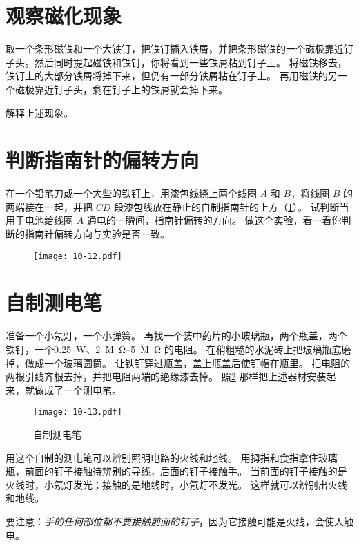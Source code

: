\section{观察磁化现象}
取一个条形磁铁和一个大铁钉，把铁钉插入铁屑，并把条形磁铁的一个磁极靠近钉子头。然后同时提起磁铁和铁钉，你将看到一些铁屑粘到钉子上。
将磁铁移去，铁钉上的大部分铁屑将掉下来，但仍有一部分铁屑粘在钉子上。
再用磁铁的另一个磁极靠近钉子头，剩在钉子上的铁屑就会掉下来。

解释上述现象。

\section{判断指南针的偏转方向}
在一个铅笔刀或一个大些的铁钉上，用漆包线绕上两个线圈 $A$ 和 $B$，将线圈 $B$ 的两端接在一起，并把 $CD$ 段漆包线放在静止的自制指南针的上方（\cref{fig:10-12}）。
试判断当用于电池给线圈 $A$ 通电的一瞬间，指南针偏转的方向。
做这个实验，看一看你判断的指南针偏转方向与实验是否一致。
\begin{figure}
  \texttt{[image: 10-12.pdf]}
  \caption{}\label{fig:10-12}
\end{figure}

\section{自制测电笔}
准备一个小氖灯，一个小弹簧。
再找一个装中药片的小玻璃瓶，两个瓶盖，两个铁钉，一个\qty{0.25}{W}、\qtyrange{2}{5}{M\ohm} 的电阻。
在稍粗糙的水泥砖上把玻璃瓶底磨掉，做成一个玻璃圆筒。
让铁钉穿过瓶盖，盖上瓶盖后使钉帽在瓶里。
把电阻的两根引线齐根去掉，并把电阻两端的绝缘漆去掉。
照\cref{fig:10-13} 那样把上述器材安装起来，就做成了一个测电笔。
\begin{figure}
  \texttt{[image: 10-13.pdf]}
  \caption{自制测电笔}\label{fig:10-13}
\end{figure}

用这个自制的测电笔可以辨别照明电路的火线和地线。
用拇指和食指拿住玻璃瓶，前面的钉子接触待辨别的导线，后面的钉子接触手。
当前面的钉子接触的是火线时，小氖灯发光；接触的是地线时，小氖灯不发光。
这样就可以辨别出火线和地线。

要注意：\emph{手的任何部位都不要接触前面的钉子}，因为它接触可能是火线，会使人触电。

